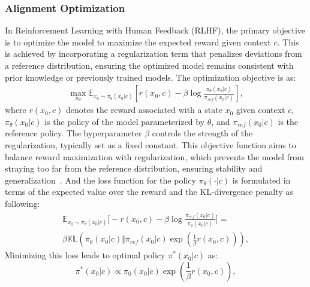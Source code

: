 \subsubsection{Alignment Optimization}
In Reinforcement Learning with Human Feedback (RLHF), the primary objective is to optimize the model to maximize the expected reward given context \( c \). This is achieved by incorporating a regularization term that penalizes deviations from a reference distribution, ensuring the optimized model remains consistent with prior knowledge or previously trained models. The optimization objective is as:
\small
\begin{multline}
    \max_{\pi_\theta} \mathbb{E}_{x_0 \sim \pi_\theta(x_0|c)} \left[ r(x_0, c)
    - \beta \log \frac{\pi_\theta(x_0|c)}{\pi_{ref}(x_0|c)} \right] ,
    \label{eq:objective}
\end{multline}
\normalsize
where \( r(x_0, c) \) denotes the reward associated with a state \( x_0 \) given context \( c \), \( \pi_\theta(x_0|c) \) is the policy of the model parameterized by \( \theta \), and \( \pi_{ref}(x_0|c) \) is the reference policy. The hyperparameter \( \beta \) controls the strength of the regularization, typically set as a fixed constant. This objective function aims to balance reward maximization with regularization, which prevents the model from straying too far from the reference distribution, ensuring stability and generalization~\cite{zhang_2023_ltbook}. 
And the loss function for the policy \( \pi_\theta(\cdot|c) \) is formulated in terms of the expected value over the reward and the KL-divergence penalty as following:
\vspace{-4pt}
\small
\begin{multline}
\mathbb{E}_{x_0 \sim \pi_\theta(x_0|c)} \Big[ -r(x_0, c) - \beta \log \frac{\pi_{ref}(x_0|c)}{\pi_\theta(x_0|c)} \Big] = \\
\beta \mathbb{KL} \left( \pi_\theta(x_0|c) \Big\Vert \pi_{ref}(x_0|c) \exp \left( \frac{1}{\beta} r(x_0, c) \right) \right),
\end{multline}
\normalsize
Minimizing this loss leads to optimal policy \( \pi^*(x_0|c) \) as:
\vspace{-4pt}
\small
\begin{equation}
\pi^*(x_0|c) \propto \pi_0(x_0|c) \exp \left( \frac{1}{\beta} r(x_0, c) \right),
\end{equation}
